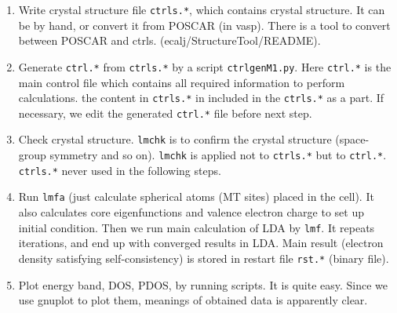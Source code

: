 \documentclass[a4paper,10pt,epsf,fleqn]{article}
\begin{document}
\begin{enumerate}
\item Write crystal structure file \verb+ctrls.*+, which contains crystal structure.
  It can be by hand, or convert it from POSCAR (in vasp). There
  is a tool to convert between POSCAR and ctrls. (ecalj/StructureTool/README).
\item Generate \verb+ctrl.*+ from \verb+ctrls.*+ by a script \verb+ctrlgenM1.py+. 
     Here \verb+ctrl.*+ is the main control file which contains all required
     information to perform calculations. the content in \verb+ctrls.*+
     in included in the \verb+ctrls.*+ as a part.
     If necessary, we edit the generated \verb+ctrl.*+ file before next step.
\item
     Check crystal structure. \verb+lmchk+ is to confirm the crystal structure
     (space-group symmetry and so on). \verb+lmchk+ is applied not to
     \verb+ctrls.*+ but to \verb+ctrl.*+.
     \verb+ctrls.*+ never used in the following steps.
\item Run \verb+lmfa+ (just calculate spherical atoms (MT sites) placed in the cell). 
     It also calculates core eigenfunctions and valence electron charge
      to set up initial condition. Then we run main calculation of LDA by \verb+lmf+.
     It repeats iterations, and end up with converged results in LDA. Main result
      (electron density satisfying self-consistency) is stored in
      restart file \verb+rst.*+ (binary file).
\item Plot energy band, DOS, PDOS, by running scripts. It is quite easy.
      Since we use gnuplot to plot them, meanings of obtained data is
      apparently clear.
\end{enumerate}
\end{document}
